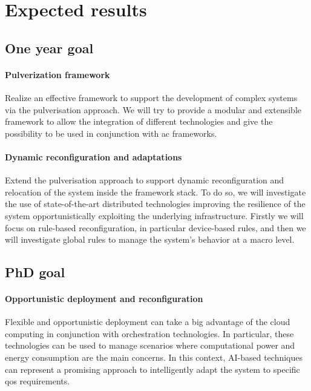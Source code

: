 \documentclass[12pt]{article}
\newcommand{\meta}[1]{{\color{blue}#1}}
\begin{document}
\section{Expected results}\label{sec:expected-results}

\subsection{One year goal}

\paragraph{Pulverization framework}
Realize an effective framework to support the development of complex systems
via the pulverisation approach.
%
We will try to provide a modular and extensible framework to allow the integration
of different technologies and give the possibility to be used in conjunction with
\ac{ac} frameworks.

\paragraph{Dynamic reconfiguration and adaptations}
Extend the pulverisation approach to support dynamic reconfiguration and relocation
of the system inside the framework stack.
%
To do so,
we will investigate the use of state-of-the-art distributed technologies
improving the resilience of the system opportunistically exploiting
the underlying infrastructure.
%
Firstly we will focus on rule-based reconfiguration,
in particular device-based rules, and then we will investigate
global rules to manage the system's behavior at a macro level.

\subsection{PhD goal}

\paragraph{Opportunistic deployment and reconfiguration}
\meta{
Flexible and opportunistic deployment can take a big advantage of the cloud
computing in conjunction with orchestration technologies.
%
In particular, these technologies can be used to manage scenarios where
computational power and energy consumption are the main concerns.
%
In this context, AI-based techniques can represent a promising
approach to intelligently adapt the system to specific \ac{qos} requirements.
}
\end{document}
